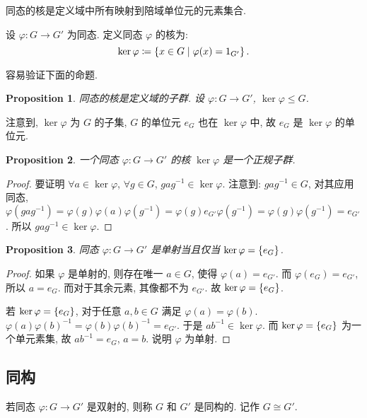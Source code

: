 \documentclass[UTF8]{ctexart}
\theoremstyle{mystyle}
\newtheorem{proposition}{Proposition}[section]
\theoremstyle{myremark}
\theoremstyle{plain}
\DeclarePairedDelimiter\set{\{}{\}}
\begin{document}
同态的核是定义域中所有映射到陪域单位元的元素集合.
\begin{definition}
    设 $ \varphi \colon G \to G' $ 为同态. 定义同态 $ \varphi $ 的核为: \[ \ker \varphi \coloneqq \set{x \in G \mid \varphi(x) = 1_{G'}} \,.\]
\end{definition}


容易验证下面的命题.
\begin{proposition}
    同态的核是定义域的子群. 设 $ \varphi \colon G \to G' $, $ \ker \varphi \le G $.
\end{proposition}

注意到, $ \ker \varphi $ 为 $ G $ 的子集, $ G $ 的单位元 $ e_G $ 也在 $ \ker \varphi $ 中, 故 $ e_G $ 是 $ \ker \varphi $ 的单位元.

\begin{proposition}
    一个同态 $ \varphi \colon G \to G' $ 的核 $ \ker \varphi $ 是一个正规子群.
\end{proposition}

\begin{proof}
    要证明 $ \forall a \in \ker \varphi $, $ \forall g \in G $, $ g a g^{-1} \in \ker \varphi $. 注意到: $ g a g^{-1} \in G $, 对其应用同态, $ \varphi(g a g^{-1}) = \varphi(g) \varphi(a) \varphi(g^{-1}) = \varphi(g) e_{G'} \varphi(g^{-1}) = \varphi(g) \varphi(g^{-1}) = e_{G'} $. 所以 $ g a g^{-1} \in \ker\varphi $.
\end{proof}

\begin{proposition}
    同态 $ \varphi \colon G \to G' $ 是单射当且仅当 $ \ker \varphi = \set{e_G} $.
\end{proposition}

\begin{proof}
    如果 $ \varphi $ 是单射的, 则存在唯一 $ a \in G $, 使得 $ \varphi(a) = e_{G'} $. 而 $ \varphi(e_{G}) = e_{G'} $, 所以 $ a = e_G $. 而对于其余元素, 其像都不为 $ e_{G'} $. 故 $ \ker \varphi = \set{e_G} $.

    若 $ \ker \varphi = \set{e_G} $, 对于任意 $ a, b \in G $ 满足 $ \varphi(a) = \varphi(b) $. $ \varphi(a) \varphi(b)^{-1} = \varphi(b) \varphi(b)^{-1} = e_{G'} $. 于是 $ a b^{-1} \in \ker \varphi $. 而 $ \ker \varphi = \set{e_G} $ 为一个单元素集, 故 $ a b^{-1} = e_G $, $ a = b $. 说明 $ \varphi $ 为单射.
\end{proof}

\subsection{同构}
\begin{definition}
    若同态 $ \varphi \colon G \to G' $ 是双射的, 则称 $ G $ 和 $ G' $ 是同构的. 记作 $ G \cong G' $.
\end{definition}
\end{document}
